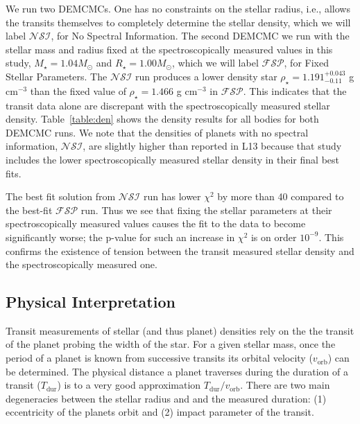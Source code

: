 \documentclass[oneside]{emulateapj}
\begin{document}
We run two DEMCMCs. One has no constraints on the stellar radius, i.e., allows the transits themselves to completely determine the stellar density, which we will label $\mathcal{NSI}$, for No Spectral Information. The second DEMCMC we run with the stellar mass and radius fixed at the spectroscopically measured values in this study, $M_\star=1.04M_\odot$ and $R_\star=1.00M_\odot$, which we will label $\mathcal{FSP}$, for Fixed Stellar Parameters. The $\mathcal{NSI}$ run produces a lower density star $\rho_\star = 1.191^{+0.043}_{-0.11}$ g cm$^{-3}$ than the fixed value of $\rho_\star = 1.466$ g cm$^{-3}$ in $\mathcal{FSP}$. This indicates that the transit data alone are discrepant with the spectroscopically measured stellar density. Table~\ref{table:den} shows the density results for all bodies for both DEMCMC runs. We note that the densities of planets with no spectral information, $\mathcal{NSI}$, are slightly higher than reported in L13 because that study includes the lower spectroscopically measured stellar density in their final best fits.

The best fit solution from $\mathcal{NSI}$ run has lower $\chi^2$ by more than 40 compared to the best-fit $\mathcal{FSP}$ run. Thus we see that fixing the stellar parameters at their spectroscopically measured values causes the fit to the \Kepler data to become significantly worse; the p-value for such an increase in $\chi^2$ is on order $10^{-9}$. This confirms the existence of tension between the transit measured stellar density and the spectroscopically measured one.  

\subsection{Physical Interpretation}

Transit measurements of stellar (and thus planet) densities rely on the the transit of the planet probing the width of the star. For a given stellar mass, once the period of a planet is known from successive transits its orbital velocity ($v_\mathrm{orb}$) can be determined. The physical distance a planet traverses during the duration of a transit ($T_\mathrm{dur}$) is to a very good approximation $T_\mathrm{dur} / v_\mathrm{orb}$. There are two main degeneracies between the stellar radius and and the measured duration: (1) eccentricity of the planets orbit and (2) impact parameter of the transit. 
\end{document}
